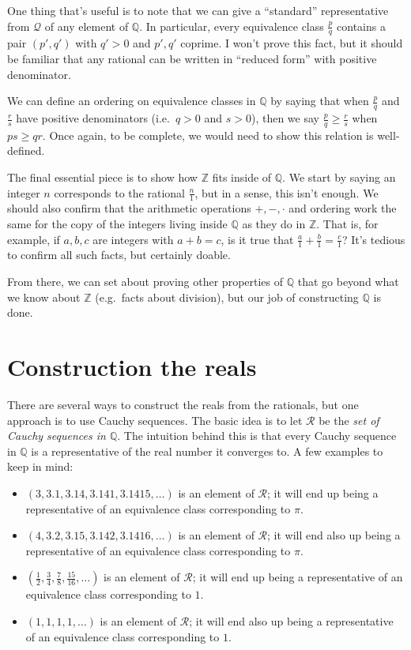 \documentclass[
  letterpaper,
  DIV=11,
  numbers=noendperiod]{scrreprt}
\providecommand{\tightlist}{%
  \setlength{\itemsep}{0pt}\setlength{\parskip}{0pt}}
\def\Q{\mathbb Q}
\def\Z{\mathbb Z}
\theoremstyle{plain}
\theoremstyle{definition}
\theoremstyle{plain}
\theoremstyle{plain}
\theoremstyle{definition}
\theoremstyle{definition}
\theoremstyle{remark}
\begin{document}
One thing that's useful is to note that we can give a ``standard''
representative from \(\mathcal Q\) of any element of \(\Q\). In
particular, every equivalence class \(\frac{p}{q}\) contains a pair
\((p',q')\) with \(q'>0\) and \(p',q'\) coprime. I won't prove this
fact, but it should be familiar that any rational can be written in
``reduced form'' with positive denominator.

We can define an ordering on equivalence classes in \(\Q\) by saying
that when \(\frac{p}{q}\) and \(\frac{r}{s}\) have positive denominators
(i.e.~\(q>0\) and \(s>0\)), then we say \(\frac{p}{q}\geq\frac{r}{s}\)
when \(ps\geq qr\). Once again, to be complete, we would need to show
this relation is well-defined.

The final essential piece is to show how \(\Z\) fits inside of \(\Q\).
We start by saying an integer \(n\) corresponds to the rational
\(\frac{n}{1}\), but in a sense, this isn't enough. We should also
confirm that the arithmetic operations \(+,-,\cdot\) and ordering work
the same for the copy of the integers living inside \(\Q\) as they do in
\(\Z\). That is, for example, if \(a,b,c\) are integers with \(a+b=c\),
is it true that \(\frac{a}{1}+\frac{b}{1}=\frac{c}{1}\)? It's tedious to
confirm all such facts, but certainly doable.

From there, we can set about proving other properties of \(\Q\) that go
beyond what we know about \(\Z\) (e.g.~facts about division), but our
job of constructing \(\Q\) is done.

\section{Construction the reals}\label{construction-the-reals}

There are several ways to construct the reals from the rationals, but
one approach is to use Cauchy sequences. The basic idea is to let
\(\mathcal R\) be the \emph{set of Cauchy sequences in \(\Q\)}. The
intuition behind this is that every Cauchy sequence in \(\Q\) is a
representative of the real number it converges to. A few examples to
keep in mind:

\begin{itemize}
\tightlist
\item
  \((3,3.1,3.14,3.141,3.1415,\ldots)\) is an element of \(\mathcal R\);
  it will end up being a representative of an equivalence class
  corresponding to \(\pi\).
\item
  \((4,3.2,3.15,3.142,3.1416,\ldots)\) is an element of \(\mathcal R\);
  it will end also up being a representative of an equivalence class
  corresponding to \(\pi\).
\item
  \((\frac{1}{2},\frac{3}{4},\frac{7}{8},\frac{15}{16},\ldots)\) is an
  element of \(\mathcal R\); it will end up being a representative of an
  equivalence class corresponding to \(1\).
\item
  \((1,1,1,1,\ldots)\) is an element of \(\mathcal R\); it will end also
  up being a representative of an equivalence class corresponding to
  \(1\).
\end{itemize}
\end{document}
